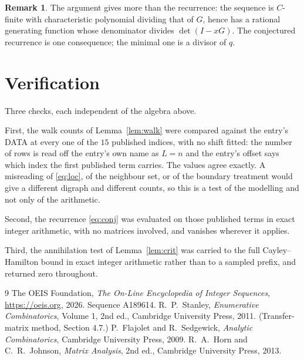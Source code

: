 \documentclass[11pt,a4paper]{article}
\theoremstyle{plain}
\theoremstyle{definition}
\newtheorem{remark}[theorem]{Remark}
\begin{document}
\begin{remark}
The argument gives more than the recurrence: the sequence is $C$-finite with characteristic
polynomial dividing that of $G$, hence has a rational generating function whose denominator
divides $\det(I-xG)$. The conjectured recurrence is one consequence; the minimal one is a
divisor of $q$.
\end{remark}

\section{Verification}

Three checks, each independent of the algebra above.

First, the walk counts of Lemma~\ref{lem:walk} were compared against the entry's DATA at
every one of the $15$ published indices, with no shift fitted: the number of rows is
read off the entry's own name as $L=n$ and the entry's offset says which index the first
published term carries. The values agree exactly. A misreading of \eqref{eq:loc}, of the
neighbour set, or of the boundary treatment would give a different digraph and different
counts, so this is a test of the modelling and not only of the arithmetic.

Second, the recurrence \eqref{eq:conj} was evaluated on those published terms in exact
integer arithmetic, with no matrices involved, and vanishes wherever it applies.

Third, the annihilation test of Lemma~\ref{lem:crit} was carried to the full
Cayley--Hamilton bound in exact integer arithmetic rather than to a sampled prefix, and
returned zero throughout.

\begin{thebibliography}{9}
 The OEIS Foundation, \emph{The On-Line Encyclopedia of Integer
Sequences}, \url{https://oeis.org}, 2026. Sequence A189614.
 R.~P.~Stanley, \emph{Enumerative Combinatorics}, Volume 1, 2nd ed.,
Cambridge University Press, 2011. (Transfer-matrix method, Section 4.7.)
 P.~Flajolet and R.~Sedgewick, \emph{Analytic Combinatorics}, Cambridge
University Press, 2009.
 R.~A.~Horn and C.~R.~Johnson, \emph{Matrix Analysis}, 2nd ed., Cambridge
University Press, 2013.
\end{thebibliography}
\end{document}
